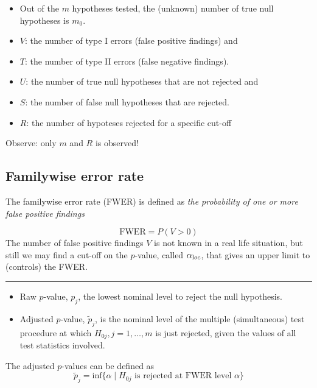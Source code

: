 \documentclass[
  letterpaper,
  DIV=11,
  numbers=noendperiod]{scrartcl}
\providecommand{\tightlist}{%
  \setlength{\itemsep}{0pt}\setlength{\parskip}{0pt}}\usepackage{longtable,booktabs,array}
\begin{document}
\begin{itemize}
\tightlist
\item
  Out of the \(m\) hypotheses tested, the (unknown) number of true null
  hypotheses is \(m_0\).
\item
  \(V\): the number of type I errors (false positive findings) and
\item
  \(T\): the number of type II errors (false negative findings).
\item
  \(U\): the number of true null hypotheses that are not rejected and
\item
  \(S\): the number of false null hypotheses that are rejected.
\item
  \(R\): the number of hypoteses rejected for a specific cut-off
\end{itemize}

Observe: only \(m\) and \(R\) is observed!

\hypertarget{familywise-error-rate}{%
\subsection{Familywise error rate}\label{familywise-error-rate}}

The familywise error rate (FWER) is defined as \emph{the probability of
one or more false positive findings}

\[ \text{FWER} = P(V > 0) \] The number of false positive findings \(V\)
is not known in a real life situation, but still we may find a cut-off
on the \(p\)-value, called \(\alpha_{\text loc}\), that gives an upper
limit to (controls) the FWER.

\begin{center}\rule{0.5\linewidth}{0.5pt}\end{center}

\begin{itemize}
\tightlist
\item
  Raw \(p\)-value, \(p_j\), the lowest nominal level to reject the null
  hypothesis.\\
\item
  Adjusted \(p\)-value, \(\tilde{p}_j\), is the nominal level of the
  multiple (simultaneous) test procedure at which
  \(H_{0j}, j=1,\ldots,m\) is just rejected, given the values of all
  test statistics involved.
\end{itemize}

The adjusted \(p\)-values can be defined as
\[\tilde{p}_j = \text{inf}\{\alpha  \mid H_{0j}\text{ is rejected at FWER level } \alpha \}\]
\end{document}
